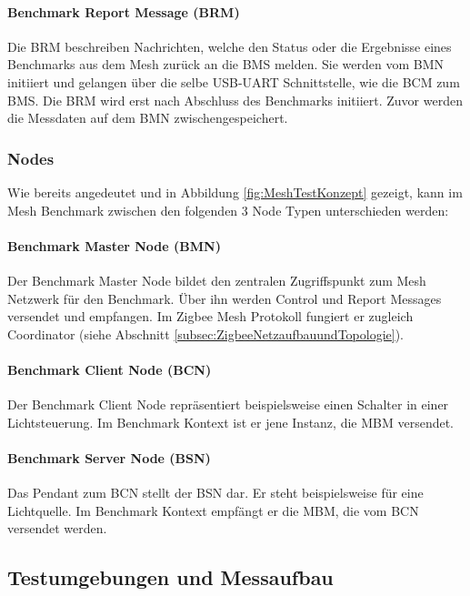 \paragraph{Benchmark Report Message (BRM)}
Die BRM beschreiben Nachrichten, welche den Status oder die Ergebnisse eines Benchmarks aus dem Mesh zurück an die BMS melden. Sie werden vom BMN initiiert und gelangen über die selbe USB-UART Schnittstelle, wie die BCM zum BMS. Die BRM wird erst nach Abschluss des Benchmarks initiiert. Zuvor werden die Messdaten auf dem BMN zwischengespeichert.

\subsubsection{Nodes}\label{subsubsec:Nodes}
Wie bereits angedeutet und in Abbildung \ref{fig:MeshTestKonzept} gezeigt, kann im Mesh Benchmark zwischen den folgenden 3 Node Typen unterschieden werden:

\paragraph{Benchmark Master Node (BMN)}
Der Benchmark Master Node bildet den zentralen Zugriffspunkt zum Mesh Netzwerk für den Benchmark. Über ihn werden Control und Report Messages versendet und empfangen. Im Zigbee Mesh Protokoll fungiert er zugleich Coordinator (siehe Abschnitt \ref{subsec:ZigbeeNetzaufbauundTopologie}).

\paragraph{Benchmark Client Node (BCN)}
Der Benchmark Client Node repräsentiert beispielsweise einen Schalter in einer Lichtsteuerung. Im Benchmark Kontext ist er jene Instanz, die MBM versendet.

\paragraph{Benchmark Server Node (BSN)}
Das Pendant zum BCN stellt der BSN dar. Er steht beispielsweise für eine Lichtquelle. Im Benchmark Kontext empfängt er die MBM, die vom BCN versendet werden.


\subsection{Testumgebungen und Messaufbau}\label{subsubsec:TestumgebungenundMessaufbau}

